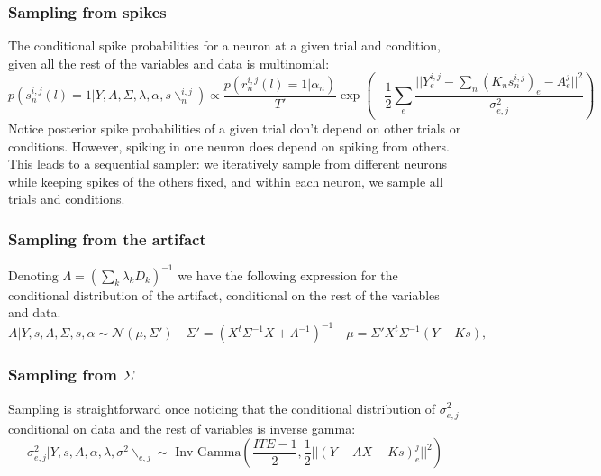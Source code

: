 \documentclass[12pt,letterpaper,fleqn]{article}
\begin{document}
\subsubsection{Sampling from spikes}
The conditional spike probabilities for a neuron at a given trial and condition, given all the rest of the variables and data is multinomial:
$$p(s_n^{i,j}(l)=1|Y,A,\Sigma,\lambda,\alpha,s\backslash_{n}^{i,j})\propto \frac{p(r_n^{i,j}(l)=1|\alpha_n)}{T'}\exp\left(-\frac{1}{2}\sum_e \frac{||Y_e^{i,j}-\sum_n (K_n  s_n^{i,j})_e-A^j_e||^2}{\sigma^2_{e,j}}\right)$$
Notice posterior spike probabilities of a given trial don't depend on other trials or conditions. However, spiking in one neuron does depend on spiking from others. This leads to a sequential sampler: we iteratively sample from different neurons while keeping spikes of the others fixed, and within each neuron, we sample all trials and conditions.
\subsubsection{Sampling from the artifact}
Denoting $\Lambda=\left(\sum_k \lambda_k D_k\right)^{-1}$ we have the following expression for the conditional distribution of the artifact, conditional on the rest of the variables and data.
$$A|Y,s,\Lambda,\Sigma,s,\alpha\sim \mathcal{N}(\mu,\Sigma')\quad \Sigma'=\left(X^t\Sigma^{-1}X+\Lambda^{-1}\right)^{-1}\quad \mu=\Sigma'X^t\Sigma^{-1}(Y-Ks),$$
\subsubsection{Sampling from $\Sigma$}
Sampling is straightforward once noticing that the conditional distribution of $\sigma^2_{e,j}$ conditional on data and the rest of variables is inverse gamma:
$$\sigma^2_{e,j}|Y,s,A,\alpha,\lambda,\sigma^2\backslash_{e,j}\sim\text{ Inv-Gamma}\left(\frac{ITE-1}{2},\frac{1}{2}||(Y-AX-Ks)^j_e||^2\right)$$
\end{document}
